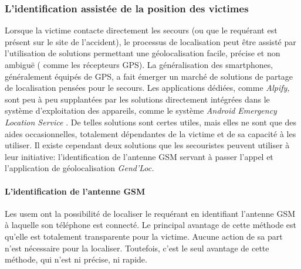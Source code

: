 \subsubsection{L'identification assistée de la position des victimes}
\label{subsec:1-1-2-2}

Lorsque la victime contacte directement les secours (ou que le
requérant est présent sur le site de l'accident), le processus de
localisation peut être assisté par l'utilisation de solutions
permettant une géolocalisation facile, précise et non ambiguë (\eg
comme les récepteurs GPS). La généralisation des smartphones,
généralement équipés de GPS, a fait émerger un marché de solutions de
partage de localisation pensées pour le secours. Les applications
dédiées, comme \emph{Alpify,} sont peu à peu supplantées par les
solutions directement intégrées dans le système d'exploitation des
appareils, comme le système \emph{Android Emergency Location Service}
\autocite{Google2019}. De telles solutions sont certes utiles, mais
elles ne sont que des aides occasionnelles, totalement dépendantes de
la victime et de sa capacité à les utiliser. Il existe cependant deux
solutions que les secouristes peuvent utiliser à leur initiative:
l'identification de l'antenne GSM servant à passer l'appel et
l'application de géolocalisation \emph{Gend'Loc.}

\paragraph{L'identification de l'antenne GSM}

Les \ac{usem} ont la possibilité de localiser le requérant en
identifiant l'antenne GSM à laquelle son téléphone est connecté. Le
principal avantage de cette méthode est qu'elle est totalement
transparente pour la victime. Aucune action de sa part n'est
nécessaire pour la localiser. Toutefois, c'est le seul avantage de
cette méthode, qui n'est ni précise, ni rapide.

